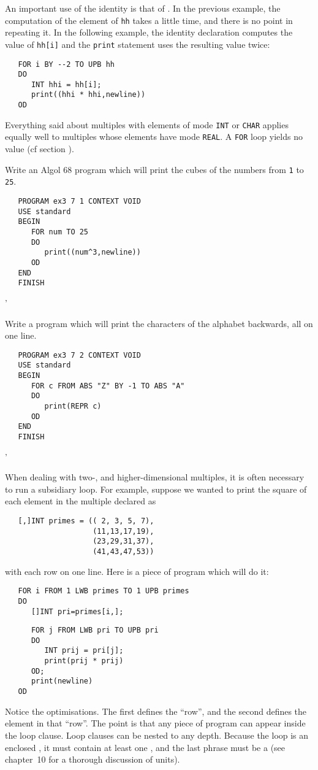 An important use of the identity
 is that of
. In the previous example, the computation of the
 element of \verb|hh| takes a little time,
and there is no point in repeating it.  In the following example, the
identity declaration computes the value of \verb|hh[i]| and the
\verb|print| statement uses the resulting value twice:
\begin{verbatim}
   FOR i BY --2 TO UPB hh
   DO
      INT hhi = hh[i];
      print((hhi * hhi,newline))
   OD
\end{verbatim}
\noindent
Everything said about multiples with elements of mode \verb|INT| or
\verb|CHAR| applies equally well to multiples whose elements have
mode \verb|REAL|. A \verb|FOR| loop yields no value (cf section
).

\begin{exercise}
\item Write an Algol 68 program which will print the cubes of the numbers
from \verb|1| to \verb|25|. \ans \ %
\begin{verbatim}
   PROGRAM ex3 7 1 CONTEXT VOID
   USE standard
   BEGIN
      FOR num TO 25
      DO
         print((num^3,newline))
      OD
   END
   FINISH
\end{verbatim}
'
\item Write a program which will print the characters of the alphabet
backwards, all on one line. \ans \ %
\begin{verbatim}
   PROGRAM ex3 7 2 CONTEXT VOID
   USE standard
   BEGIN
      FOR c FROM ABS "Z" BY -1 TO ABS "A"
      DO
         print(REPR c)
      OD
   END
   FINISH
\end{verbatim}
'
\end{exercise}

When dealing with two-, and higher-dimensional multiples, it is often
necessary to run a subsidiary loop. For example, suppose we wanted to
print the square of each element in the multiple declared as
\begin{verbatim}
   [,]INT primes = (( 2, 3, 5, 7),
                    (11,13,17,19),
                    (23,29,31,37),
                    (41,43,47,53))
\end{verbatim}
\noindent
with each row on one line. Here is a piece of program which will do
it:
\begin{verbatim}
   FOR i FROM 1 LWB primes TO 1 UPB primes
   DO
      []INT pri=primes[i,];
\end{verbatim}
\begin{verbatim}
      FOR j FROM LWB pri TO UPB pri
      DO
         INT prij = pri[j];
         print(prij * prij)
      OD;
      print(newline)
   OD
\end{verbatim}
\noindent
Notice the optimisations. The first defines the 
``row'', and the second defines the  element in that
``row''. The point is that any piece of program can appear inside the
loop clause.  Loop clauses can be nested to any depth.  Because the
loop  is an enclosed
, it must contain at least one
, and the last phrase must be a  (see chapter~10
for a thorough discussion of units).

